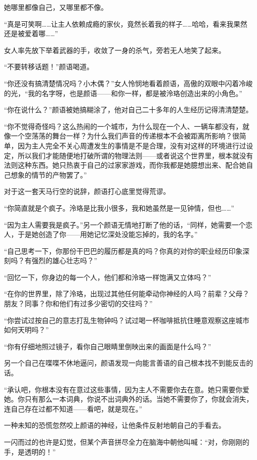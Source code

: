 \documentclass[UTF8, scheme = chinese, openany]{ctexbook}
\begin{document}
她哪里都像自己，又哪里都不像。

“真是可笑啊……让主人依赖成瘾的家伙，竟然长着我的样子……哈哈，看来我果然还是被爱着哪……”

女人率先放下举着武器的手，收敛了一身的杀气，旁若无人地笑了起来。

“不要转移话题！”颜语喝道。

“你还没有搞清楚情况吗？小木偶？”女人怜悯地看着颜语，高傲的双眼中闪着冷峻的光，“我的名字呀，也是颜语——和你一样，都是被泠珞创造出来的小角色。”

“你在说什么？”颜语被她搞糊涂了，他对自己二十多年的人生经历记得清清楚楚。

“你不觉得奇怪吗？这么热闹的一个城市，为什么现在一个人、一辆车都没有，就像一个空荡荡的舞台一样？为什么我们声音的传递根本不会被距离所影响？很简单，因为主人完全不关心周遭发生的事情是不是合理，没有对这样的环境进行过设定，所以我们才能随便地打破所谓的物理法则——或者说这个世界里，根本就没有法则这种东西。她只热衷于自己的过家家游戏，而你我都是她臆想出来、配合她自己想象的情节的产物罢了。”

对于这一套天马行空的说辞，颜语打心底里觉得荒谬。

“你简直就是个疯子。泠珞是比我小很多，我和她虽然是一见钟情，但也……”

“因为主人需要我是疯子。”另一个颜语无情地打断了他的话，“同样，她需要一个恋人，于是她创造了你——用她记忆深处没能忘掉的，我的名字。”

“自己思考一下，你那份干巴巴的履历都是真的吗？你真的对你的职业经历印象深刻吗？有强烈的雄心壮志吗？”

“回忆一下，你身边的每一个人，他们都和泠珞一样饱满又立体吗？”

“在你的世界里，除了泠珞，出现过其他任何能牵动你神经的人吗？前辈？父母？朋友？同事？你和他们有过多少密切的交往吗？”

“你尝试过按自己的意志打乱生物钟吗？试过喝一杯咖啡抵抗住睡意观察这座城市如何天明吗？”

“你有仔细地照过镜子，看你自己眼睛里倒映出来的画面是什么吗？”

另一个自己在喋喋不休地逼问，颜语发现一向能言善语的自己根本找不到能反击的话。

“承认吧，你根本没有在意过这些事情，因为主人不需要你去在意。她只需要你爱她。你只有那么一本词典，你说不出词典外的话。当她不需要你了，你就会消失，连自己存在过都不知道——看吧，就是现在。”

一种未知的恐慌忽然咬上颜语的神经，让他条件反射地朝自己的手看去。

一闪而过的也许是幻觉，但某个声音拼尽全力在脑海中朝他叫喊：“对，你刚刚的手，是透明的！”
\end{document}
